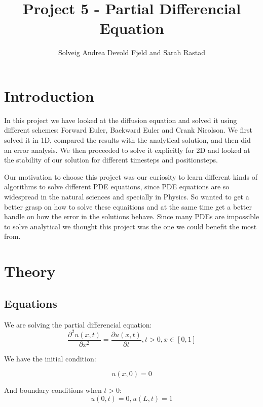 \documentclass[a4paper,10pt]{article}
\title{Project 5 - Partial Differencial Equation}
\author{Solveig Andrea Devold Fjeld and Sarah Rastad}
\begin{document}
\maketitle

\begin{abstract}

\end{abstract}

\section{Introduction}
In this project we have looked at the diffusion equation and solved it using different schemes: Forward Euler, Backward Euler
and Crank Nicolson. We first solved it in 1D, compared the results with the analytical solution, and then did an error analysis. We then proceeded to 
solve it explicitly for 2D and looked at the stability of our solution for different timesteps and positionsteps. 

Our motivation to choose this project was our curiosity to learn different kinds of algorithms to solve different PDE equations, since PDE equations
are so widespread in the natural sciences and specially in Physics. So wanted to get a better grasp on how to solve these equaitions and at the same time
get a better handle on how the error in the solutions behave. Since many PDEs are impossible to solve analytical we thought this project
was the one we could benefit the most from.

\section{Theory}
\subsection{Equations}
We are solving the partial differencial equation:
\begin{equation}
  \frac{\partial^2 u(x,t)}{\partial x^2} =\frac{\partial u(x,t)}{\partial t}, t> 0, x\in [0,1]
  \label{eq:PartDiff}
\end{equation}

We have the initial condition:

\begin{equation}
 u(x,0) = 0
\end{equation}

And boundary conditions when $t>0$:
\begin{equation}
 u(0,t) = 0,
 u(L,t) = 1
\end{equation}
\end{document}
